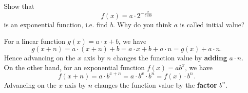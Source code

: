 \begin{exercise}
	Show that
	\begin{equation*}
		f\left(x\right)=a\cdot 2^{-\frac{x}{5730}}
	\end{equation*}
	is an exponential function, i.e. find $b$.
	Why do you think $a$ is called initial value?
\end{exercise}
\pagebreak[1]
For a linear function $g\left(x\right)=a\cdot x+b$, we have
\begin{equation*}
	g\left(x+n\right)=a\cdot\left(x+n\right)+b=a\cdot x+b+a\cdot n=g\left(x\right)+a\cdot n.
\end{equation*}
Hence advancing on the $x$ axis by $n$ changes the function value by \textbf{adding} $a\cdot n$.
On the other hand, for an exponential function $f(x)=ab^x$, we have
\begin{equation*}
	f\left(x+n\right)=a\cdot b^{x+n}=a\cdot b^x\cdot b^n=f\left(x\right)\cdot b^n.
\end{equation*}
Advancing on the $x$ axis by $n$ changes the function value by the \textbf{factor} $b^n$.
